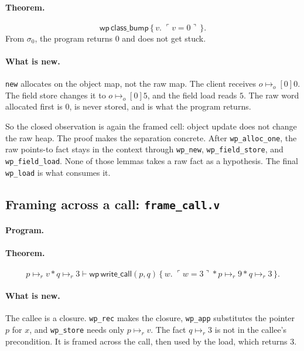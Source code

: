 \documentclass[11pt]{article}
\newcommand{\ptsr}{\mathrel{\mapsto_{r}}}
\newcommand{\ptso}{\mathrel{\mapsto_{o}}}
\newcommand{\sep}{\mathbin{*}}
\newcommand{\Wpre}{\mathsf{wp}}
\newcommand{\pure}[1]{\ulcorner #1 \urcorner}
\begin{document}
\paragraph{Theorem.}
\[
\Wpre\,\mathsf{class\_bump}\,\{\,v.\; \pure{v=0}\,\}.
\]
From \(\sigma_0\), the program returns \(0\) and does not get stuck.

\paragraph{What is new.}
\texttt{new} allocates on the object map, not the raw map.
The client receives \(o \ptso[0] 0\).
The field store changes it to \(o \ptso[0] 5\), and the field load reads \(5\).
The raw word allocated first is \(0\), is never stored, and is what the program returns.

So the closed observation is again the framed cell: object update does not change the raw heap.
The proof makes the separation concrete.
After \texttt{wp\_alloc\_one}, the raw points-to fact stays in the context through \texttt{wp\_new}, \texttt{wp\_field\_store}, and \texttt{wp\_field\_load}.
None of those lemmas takes a raw fact as a hypothesis.
The final \texttt{wp\_load} is what consumes it.

\subsection{Framing across a call: \texttt{frame\_call.v}}

\paragraph{Program.}\mbox{}\par


\paragraph{Theorem.}
\[
p \ptsr v \sep q \ptsr 3
\vdash
\Wpre\,\mathsf{write\_call}(p,q)\,
\bigl\{\,w.\;
  \pure{w=3}
  \sep p \ptsr 9
  \sep q \ptsr 3
\,\bigr\}.
\]

\paragraph{What is new.}
The callee is a closure.
\texttt{wp\_rec} makes the closure, \texttt{wp\_app} substitutes the pointer \(p\) for \(x\), and \texttt{wp\_store} needs only \(p \ptsr v\).
The fact \(q \ptsr 3\) is not in the callee's precondition.
It is framed across the call, then used by the load, which returns \(3\).
\end{document}
